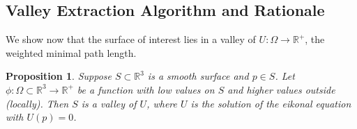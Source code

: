 \documentclass[10pt,journal,compsoc]{IEEEtran}
\newcommand{\R}{\mathbb{R}}
\newcommand{\comment}[1]{ }
\newtheorem{prop}{Proposition}
\begin{document}
\comment{
Although there is another algorithm, \cite{grady2010minimal}, for
this task, it is computationally expensive as we show in
Section~\ref{sec:expts}.
}

\subsection{Valley Extraction Algorithm and Rationale}

We show now that the surface of interest lies in a valley of
$U : \Omega\to\R^+$, the weighted minimal path length.

\begin{prop} \label{prop:surface_valley}
  Suppose $S \subset \R^3$ is a smooth surface and $p\in S$.  Let
  $\phi : \Omega \subset \R^3 \to \R^+$ be a function with low values
  on $S$ and higher values outside (locally). Then $S$ is a valley of
  $U$, where $U$ is the solution of the eikonal equation with
  $U(p)=0$.
\end{prop}
\end{document}
